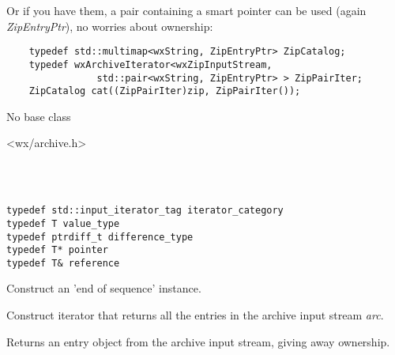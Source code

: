 Or if you have them, a pair containing a smart pointer can be used
(again {\it ZipEntryPtr}), no worries about ownership:

\begin{verbatim}
    typedef std::multimap<wxString, ZipEntryPtr> ZipCatalog;
    typedef wxArchiveIterator<wxZipInputStream,
                std::pair<wxString, ZipEntryPtr> > ZipPairIter;
    ZipCatalog cat((ZipPairIter)zip, ZipPairIter());

\end{verbatim}


No base class


<wx/archive.h>


\\
\\

\begin{verbatim}
typedef std::input_iterator_tag iterator_category
typedef T value_type
typedef ptrdiff_t difference_type
typedef T* pointer
typedef T& reference
\end{verbatim}



\label{wxarchiveiteratorwxarchiveiterator}


Construct an 'end of sequence' instance.


Construct iterator that returns all the entries in the archive input
stream {\it arc}.


\label{wxarchiveiteratoroperatorstar}


Returns an entry object from the archive input stream, giving away
ownership.


\label{wxarchiveiteratoroperatorincrement}


